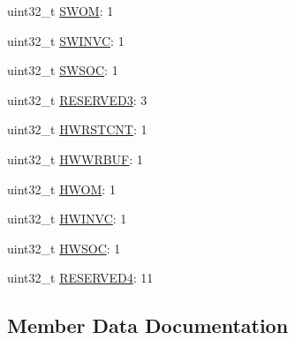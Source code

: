\begin{DoxyCompactItemize}
\item 
uint32\+\_\+t \hyperlink{struct__hw__ftm__synconf_1_1__hw__ftm__synconf__bitfields_a44d002ad1938dfa70139f7c2df218e8c}{S\+W\+OM}\+: 1
\item 
uint32\+\_\+t \hyperlink{struct__hw__ftm__synconf_1_1__hw__ftm__synconf__bitfields_a5ddd537640ba9e5f237efbc4e0e68399}{S\+W\+I\+N\+VC}\+: 1
\item 
uint32\+\_\+t \hyperlink{struct__hw__ftm__synconf_1_1__hw__ftm__synconf__bitfields_a3270e030aa7fd03bbb7d6c833718a305}{S\+W\+S\+OC}\+: 1
\item 
uint32\+\_\+t \hyperlink{struct__hw__ftm__synconf_1_1__hw__ftm__synconf__bitfields_a2a1c7e15ea6ec26dc547c8f165538c1e}{R\+E\+S\+E\+R\+V\+E\+D3}\+: 3
\item 
uint32\+\_\+t \hyperlink{struct__hw__ftm__synconf_1_1__hw__ftm__synconf__bitfields_a304b440496f56bb6446c9c30e88c33cd}{H\+W\+R\+S\+T\+C\+NT}\+: 1
\item 
uint32\+\_\+t \hyperlink{struct__hw__ftm__synconf_1_1__hw__ftm__synconf__bitfields_a7ea517f0f7045c30aca9c72c26541be9}{H\+W\+W\+R\+B\+UF}\+: 1
\item 
uint32\+\_\+t \hyperlink{struct__hw__ftm__synconf_1_1__hw__ftm__synconf__bitfields_a7f9c256a2c7480806876ee58ad1d524b}{H\+W\+OM}\+: 1
\item 
uint32\+\_\+t \hyperlink{struct__hw__ftm__synconf_1_1__hw__ftm__synconf__bitfields_ad09070fe4d0f4b0bccc6d9f54ee12b20}{H\+W\+I\+N\+VC}\+: 1
\item 
uint32\+\_\+t \hyperlink{struct__hw__ftm__synconf_1_1__hw__ftm__synconf__bitfields_a5930edfe3839d964fd45565c8eac51e4}{H\+W\+S\+OC}\+: 1
\item 
uint32\+\_\+t \hyperlink{struct__hw__ftm__synconf_1_1__hw__ftm__synconf__bitfields_ae2d19cde0689a7be39c674752fe43643}{R\+E\+S\+E\+R\+V\+E\+D4}\+: 11
\end{DoxyCompactItemize}


\subsection{Member Data Documentation}
